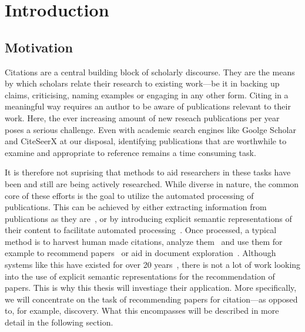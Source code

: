 \chapter{Introduction}\label{chap:introduction}
\section{Motivation}
Citations are a central building block of scholarly discourse. They are the means by which scholars relate their research to existing work---be it in backing up claims, criticising, naming examples or engaging in any other form. Citing in a meaningful way requires an author to be aware of publications relevant to their work.
Here, the ever increasing amount of new reseach publications per year poses a serious challenge. Even with academic search engines like Goolge Scholar and CiteSeerX at our disposal, identifying publications that are worthwhile to examine and appropriate to reference remains a time consuming task.

It is therefore not suprising that methods to aid researchers in these tasks have been and still are being actively researched. While diverse in nature, the common core of these efforts is the goal to utilize the automated processing of publications. This can be achieved by either extracting information from publications as they are~\cite{Nasar2018,Beel2016}, or by introducing explicit semantic representations of their content to facilitate automated processing~\cite{BuckinghamShum2000,Schneider2013,Kitamoto2015}. Once processed, a typical method is to harvest human made citations, analyze them~\cite{Abujbara2013,Teufel2006a} and use them for example to recommend papers~\cite{Beel2016} or aid in document exploration~\cite{Berger2016}. Although systems like this have existed for over 20 years~\cite{Bollacker1998,Beel2016}, there is not a lot of work looking into the use of explicit semantic representations for the recommendation of papers.
This is why this thesis will investiage their application. More specifically, we will concentrate on the task of recommending papers for citation---as opposed to, for example, discovery. What this encompasses will be described in more detail in the following section.



